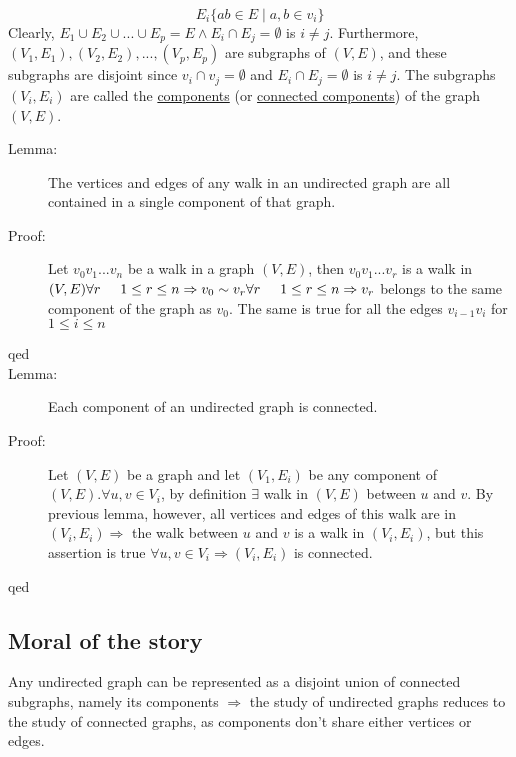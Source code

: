\documentclass[10pt]{article}
\begin{document}
	\[E_i \{ab \in E \mid a, b \in v_i \}\]
	Clearly, $E_1 \cup E_2 \cup ... \cup E_p = E \land E_i \cap E_j = \emptyset$ is $i \neq j$. Furthermore, $(V_1, E_1), (V_2, E_2), ..., (V_p, E_p)$ are subgraphs of $(V, E)$, and these subgraphs are disjoint since $v_i \cap v_j = \emptyset$ and $E_i \cap E_j = \emptyset$ is $i \neq j$. The subgraphs $(V_i, E_i)$ are called the \underline{components} (or \underline{connected components}) of the graph $(V, E)$.
	\begin{description}
		\item[Lemma:] The vertices and edges of any walk in an undirected graph are all contained in a single component of that graph.
		\item[Proof:] Let $v_0 v_1 ... v_n$ be a walk in a graph $(V, E)$, then $v_0 v_1 ... v_r$ is a walk in $(V, E) \forall r \hspace{5mm} 1 \leq r \leq n \Rightarrow v_0 \sim v_r \forall r \hspace{5mm} 1 \leq r \leq n \Rightarrow v_r$ belongs to the same component of the graph as $v_0$. The same is true for all the edges $v_{i-1}v_i$ for $1 \leq i \leq n$
		\item[qed]
		\item[Lemma:] Each component of an undirected graph is connected.
		\item[Proof:] Let $(V, E)$ be a graph and let $(V_1, E_i)$ be any component of $(V, E). \forall u, v \in V_i$, by definition $\exists$ walk in $(V, E)$ between $u$ and $v$. By previous lemma, however, all vertices and edges of this walk are in $(V_i, E_i) \Rightarrow$ the walk between $u$ and $v$ is a walk in $(V_i, E_i)$, but this assertion is true $\forall u, v \in V_i \Rightarrow (V_i, E_i)$ is connected.
		\item[qed]
	\end{description}
	
	\subsection{Moral of the story}
	Any undirected graph can be represented as a disjoint union of connected subgraphs, namely its components $\Rightarrow$ the study of undirected graphs reduces to the study of connected graphs, as components don't share either vertices or edges.
	
\end{document}
